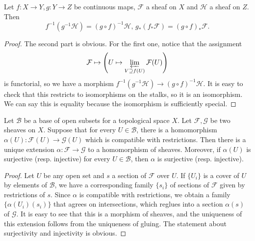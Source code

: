 \begin{exer}
	Let $f: X \to Y, g: Y \to Z$ be continuous maps, $\mathcal F$ a sheaf on
	$X$ and $\mathcal H$ a sheaf on $Z$. Then
	\[
		f^{-1}(g^{-1}\mathcal H) = (g \circ f)^{-1}\mathcal H,\,
		g_*(f_*\mathcal F) = (g \circ f)_*\mathcal F.
	\]
\end{exer}
\begin{proof}
	The second part is obvious. For the first one, notice that the
	assignment
	\[
		\mathcal F \mapsto \left(U \mapsto
			\varprojlim_{V \supseteq f(U)}\mathcal F(U)\right)
	\]
	is functorial, so we have a morphism $f^{-1}(g^{-1}\mathcal H) \to
	(g \circ f)^{-1}\mathcal H$. It is easy to check that this restricts to
	isomorphisms on the stalks, so it is an isomorphism. We can say this is
	equality because the isomorphism is sufficiently special.
\end{proof}

\begin{exer}
	Let $\mathcal B$ be a base of open subsets for a topological space $X$.
	Let $\mathcal F, \mathcal G$ be two sheaves on $X$. Suppose that for
	every $U \in \mathcal B$, there is a homomorphism
	$\alpha(U): \mathcal F(U) \to \mathcal G(U)$ which is compatible with
	restrictions. Then there is a unique extension $\alpha: \mathcal F \to
	\mathcal G$ to a homomorphism of sheaves. Moreover, if $\alpha(U)$ is
	surjective (resp. injective) for every $U \in \mathcal B$, then $\alpha$
	is surjective (resp. injective).
\end{exer}
\begin{proof}
	Let $U$ be any open set and $s$ a section of $\mathcal F$ over $U$. If
	$\{U_i\}$ is a cover of $U$ by elements of $\mathcal B$, we have a
	corresponding family $\{s_i\}$ of sections of $\mathcal F$ given by
	restrictions of $s$. Since $\alpha$ is compatible with restrictions, we
	obtain a family $\{\alpha(U_i)(s_i)\}$ that agrees on intersections,
	which reglues into a section $\alpha(s)$ of $\mathcal G$. It is easy to
	see that this is a morphism of sheaves, and the uniqueness of this
	extension follows from the uniqueness of gluing. The statement about
	surjectivity and injectivity is obvious.
\end{proof}

